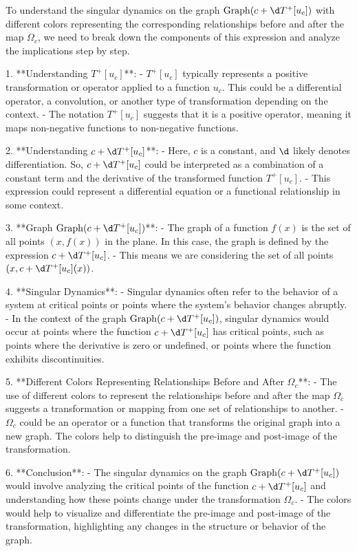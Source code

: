 To understand the singular dynamics on the graph \(\operatorname{Graph}(c + \d T^+[u_c])\) with different colors representing the corresponding relationships before and after the map \(\Omega_c\), we need to break down the components of this expression and analyze the implications step by step.

1. **Understanding \(T^+[u_c]\)**:
   - \(T^+[u_c]\) typically represents a positive transformation or operator applied to a function \(u_c\). This could be a differential operator, a convolution, or another type of transformation depending on the context.
   - The notation \(T^+[u_c]\) suggests that it is a positive operator, meaning it maps non-negative functions to non-negative functions.

2. **Understanding \(c + \d T^+[u_c]\)**:
   - Here, \(c\) is a constant, and \(\d\) likely denotes differentiation. So, \(c + \d T^+[u_c]\) could be interpreted as a combination of a constant term and the derivative of the transformed function \(T^+[u_c]\).
   - This expression could represent a differential equation or a functional relationship in some context.

3. **Graph \(\operatorname{Graph}(c + \d T^+[u_c])\)**:
   - The graph of a function \(f(x)\) is the set of all points \((x, f(x))\) in the plane. In this case, the graph is defined by the expression \(c + \d T^+[u_c]\).
   - This means we are considering the set of all points \((x, c + \d T^+[u_c](x))\).

4. **Singular Dynamics**:
   - Singular dynamics often refer to the behavior of a system at critical points or points where the system's behavior changes abruptly.
   - In the context of the graph \(\operatorname{Graph}(c + \d T^+[u_c])\), singular dynamics would occur at points where the function \(c + \d T^+[u_c]\) has critical points, such as points where the derivative is zero or undefined, or points where the function exhibits discontinuities.

5. **Different Colors Representing Relationships Before and After \(\Omega_c\)**:
   - The use of different colors to represent the relationships before and after the map \(\Omega_c\) suggests a transformation or mapping from one set of relationships to another.
   - \(\Omega_c\) could be an operator or a function that transforms the original graph into a new graph. The colors help to distinguish the pre-image and post-image of the transformation.

6. **Conclusion**:
   - The singular dynamics on the graph \(\operatorname{Graph}(c + \d T^+[u_c])\) would involve analyzing the critical points of the function \(c + \d T^+[u_c]\) and understanding how these points change under the transformation \(\Omega_c\).
   - The colors would help to visualize and differentiate the pre-image and post-image of the transformation, highlighting any changes in the structure or behavior of the graph.

